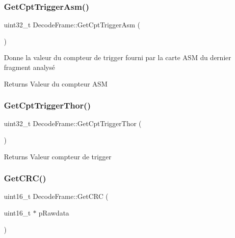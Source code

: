 \subsubsection{\texorpdfstring{Get\+Cpt\+Trigger\+Asm()}{GetCptTriggerAsm()}}
{\footnotesize\ttfamily uint32\+\_\+t Decode\+Frame\+::\+Get\+Cpt\+Trigger\+Asm (\begin{DoxyParamCaption}{ }\end{DoxyParamCaption})\hspace{0.3cm}{\ttfamily [inline]}}



Donne la valeur du compteur de trigger fourni par la carte A\+SM du dernier fragment analysé 

\begin{DoxyReturn}{Returns}
Valeur du compteur A\+SM 
\end{DoxyReturn}
\mbox{\label{classDecodeFrame_a582eb89fe03a3076f394776330a6c037}} 
\subsubsection{\texorpdfstring{Get\+Cpt\+Trigger\+Thor()}{GetCptTriggerThor()}}
{\footnotesize\ttfamily uint32\+\_\+t Decode\+Frame\+::\+Get\+Cpt\+Trigger\+Thor (\begin{DoxyParamCaption}{ }\end{DoxyParamCaption})\hspace{0.3cm}{\ttfamily [inline]}}

\begin{DoxyReturn}{Returns}
Valeur compteur de trigger 
\end{DoxyReturn}
\mbox{\label{classDecodeFrame_acb0f0ed7feeaeddc24e4b95237202517}} 
\subsubsection{\texorpdfstring{Get\+C\+R\+C()}{GetCRC()}}
{\footnotesize\ttfamily uint16\+\_\+t Decode\+Frame\+::\+Get\+C\+RC (\begin{DoxyParamCaption}\item[{uint16\+\_\+t $\ast$}]{p\+Rawdata }\end{DoxyParamCaption})\hspace{0.3cm}{\ttfamily [inline]}}



